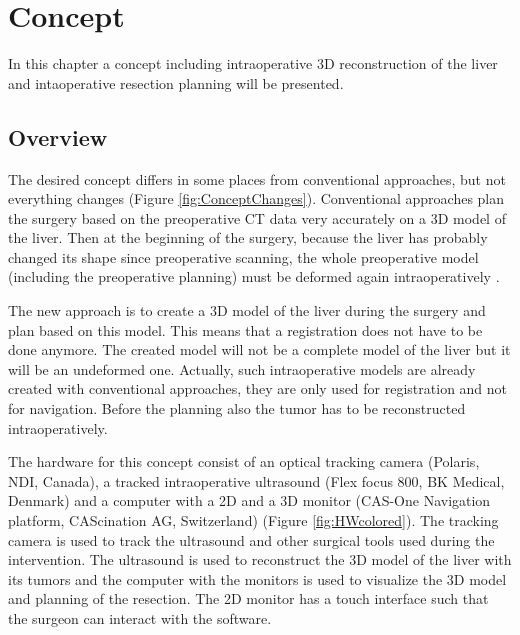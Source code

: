 \chapter{Concept}
In this chapter a concept including intraoperative 3D reconstruction of the liver and
intaoperative resection planning will be presented. 

\section{Overview}
The desired concept differs in some places from conventional approaches, but not
everything changes (Figure \ref{fig:ConceptChanges}). Conventional approaches
plan the surgery based on the preoperative CT data very accurately on a 
3D model of the liver. Then at the
beginning of
the surgery, because the liver has probably changed its shape since preoperative
scanning, the whole preoperative model (including the preoperative planning) must be deformed again 
intraoperatively \cite{payan2012soft}.

The new approach is to create a 3D model of the liver during
the surgery and plan based on this model. This means that a registration does
not have to be done anymore. The created model will not be a complete
model of the liver but it will be an undeformed one. Actually, such
intraoperative models are already created with conventional approaches, they are only used for registration
and not for navigation. Before the planning also the tumor has to be
reconstructed intraoperatively.

The hardware for this concept consist of an optical tracking camera (Polaris, NDI, Canada), a tracked
intraoperative ultrasound (Flex focus 800, BK Medical, Denmark) and a computer with a 2D and a 3D monitor (CAS-One Navigation platform, CAScination AG,
 Switzerland) (Figure \ref{fig:HWcolored}). The
tracking camera is used to track the ultrasound and other surgical tools used
during the intervention. The ultrasound is used to reconstruct the 3D model of
the liver with its tumors and the computer with the monitors is used to
visualize the 3D model and planning of the resection. The 2D monitor has a touch
interface such that the surgeon can interact with the software.


